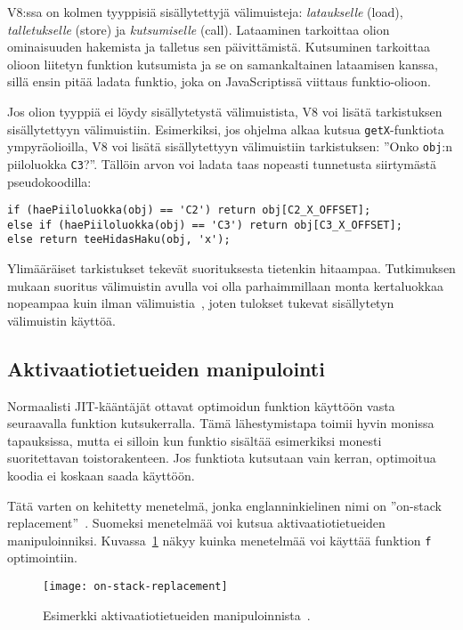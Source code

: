 V8:ssa on kolmen tyyppisiä sisällytettyjä välimuisteja: \textit{lataukselle} (load), \textit{talletukselle} (store) ja \textit{kutsumiselle} (call). Lataaminen tarkoittaa olion ominaisuuden hakemista ja talletus sen päivittämistä. Kutsuminen tarkoittaa olioon liitetyn funktion kutsumista ja se on samankaltainen lataamisen kanssa, sillä ensin pitää ladata funktio, joka on JavaScriptissä viittaus funktio-olioon.

Jos olion tyyppiä ei löydy sisällytetystä välimuistista, V8 voi lisätä tarkistuksen sisällytettyyn välimuistiin. Esimerkiksi, jos ohjelma alkaa kutsua \texttt{getX}-funktiota ympyräolioilla, V8 voi lisätä sisällytettyyn välimuistiin tarkistuksen: ''Onko \texttt{obj}:n piiloluokka \texttt{C3}?''. Tällöin arvon voi ladata taas nopeasti tunnetusta siirtymästä pseudokoodilla:
\begin{lstlisting}
if (haePiiloluokka(obj) == 'C2') return obj[C2_X_OFFSET];
else if (haePiiloluokka(obj) == 'C3') return obj[C3_X_OFFSET];
else return teeHidasHaku(obj, 'x');
\end{lstlisting}

Ylimääräiset tarkistukset tekevät suorituksesta tietenkin hitaampaa. Tutkimuksen mukaan suoritus välimuistin avulla voi olla parhaimmillaan monta kertaluokkaa nopeampaa kuin ilman välimuistia~\cite[s.~498]{Ahn2014}, joten tulokset tukevat sisällytetyn välimuistin käyttöä.

\subsection{Aktivaatiotietueiden manipulointi}

Normaalisti JIT-kääntäjät ottavat optimoidun funktion käyttöön vasta seuraavalla funktion kutsukerralla. Tämä lähestymistapa toimii hyvin monissa tapauksissa, mutta ei silloin kun funktio sisältää esimerkiksi monesti suoritettavan toistorakenteen. Jos funktiota kutsutaan vain kerran, optimoitua koodia ei koskaan saada käyttöön.

Tätä varten on kehitetty menetelmä, jonka englanninkielinen nimi on ''on-stack replacement''~\cite{osr}. Suomeksi menetelmää voi kutsua aktivaatiotietueiden manipuloinniksi. Kuvassa~\ref{fig:osr} näkyy kuinka menetelmää voi käyttää funktion \texttt{f} optimointiin.

\begin{figure}[ht]
    \texttt{[image: on-stack-replacement]}
    \caption{Esimerkki aktivaatiotietueiden manipuloinnista~\cite{osrpic}.}
     \centering
     \label{fig:osr}
\end{figure}

